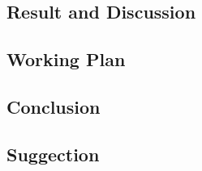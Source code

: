 \subsection*{Result and Discussion}


\subsection*{Working Plan}
\subsection*{Conclusion}

\subsection*{Suggection}